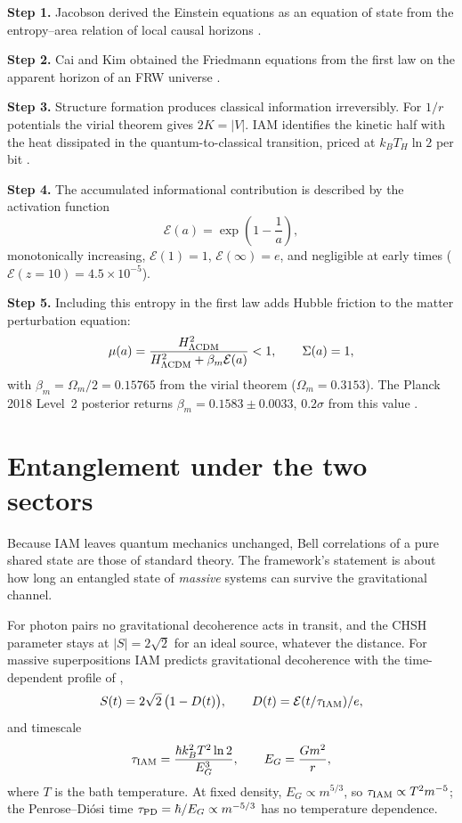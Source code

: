 \documentclass[12pt,a4paper]{article}
\begin{document}
\textbf{Step 1.} Jacobson derived the Einstein equations as an equation of state from
the entropy--area relation of local causal horizons \citep{Jacobson1995}.

\textbf{Step 2.} Cai and Kim obtained the Friedmann equations from the first law on
the apparent horizon of an FRW universe \citep{CaiKim2005}.

\textbf{Step 3.} Structure formation produces classical information irreversibly.
For $1/r$ potentials the virial theorem gives $2K=|V|$. IAM identifies the kinetic
half with the heat dissipated in the quantum-to-classical transition, priced at
$k_BT_H\ln2$ per bit \citep{Gibbons1977}.

\textbf{Step 4.} The accumulated informational contribution is described by the
activation function
\begin{equation}
\mathcal{E}(a)=\exp\!\left(1-\frac{1}{a}\right),
\label{eq:Ea}
\end{equation}
monotonically increasing, $\mathcal{E}(1)=1$, $\mathcal{E}(\infty)=e$, and
negligible at early times ($\mathcal{E}(z=10)=4.5\times10^{-5}$).

\textbf{Step 5.} Including this entropy in the first law adds Hubble friction to the
matter perturbation equation:
\begin{equation}
\mu(a)=\frac{H^2_{\Lambda\rm CDM}}{H^2_{\Lambda\rm CDM}+\beta_m\mathcal{E}(a)}<1,
\qquad \Sigma(a)=1,
\label{eq:sector}
\end{equation}
with $\beta_m=\Omega_m/2=0.15765$ from the virial theorem ($\Omega_m=0.3153$). The
Planck 2018 Level~2 posterior returns $\beta_m=0.1583\pm0.0033$, $0.2\sigma$ from
this value \citep{IAM_obs}.

\section{Entanglement under the two sectors}
\label{sec:entanglement}

Because IAM leaves quantum mechanics unchanged, Bell correlations of a pure shared
state are those of standard theory. The framework's statement is about how long an
entangled state of \emph{massive} systems can survive the gravitational channel.

For photon pairs no gravitational decoherence acts in transit, and the CHSH
parameter stays at $|S|=2\sqrt2$ for an ideal source, whatever the distance. For
massive superpositions IAM predicts gravitational decoherence with the time-dependent
profile of \citet{IAM_QM},
\begin{equation}
S(t)=2\sqrt2\,\bigl(1-D(t)\bigr),\qquad D(t)=\mathcal{E}(t/\tau_{\rm IAM})/e ,
\label{eq:bell}
\end{equation}
and timescale \citep{IAM_grav}
\begin{equation}
\tau_{\rm IAM}=\frac{\hbar k_B^2T^2\ln2}{E_G^3},\qquad E_G=\frac{Gm^2}{r},
\label{eq:tauIAM}
\end{equation}
where $T$ is the bath temperature. At fixed density, $E_G\propto m^{5/3}$, so
$\tau_{\rm IAM}\propto T^2m^{-5}$; the Penrose--Di\'osi time
$\tau_{\rm PD}=\hbar/E_G\propto m^{-5/3}$ has no temperature dependence.
\end{document}
